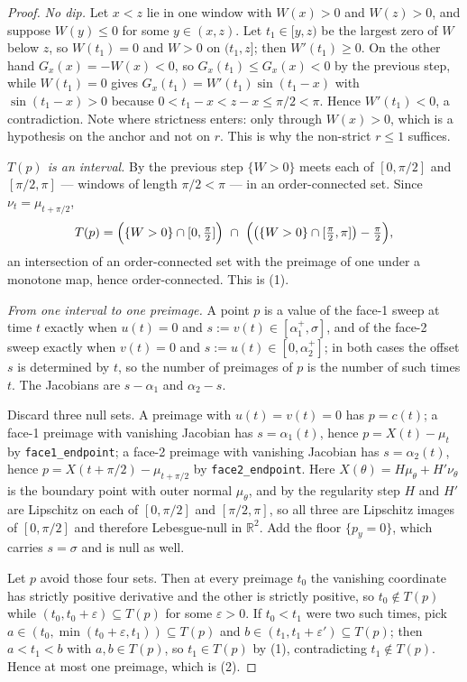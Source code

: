 \documentclass[11pt]{article}
\theoremstyle{definition}
\newcommand{\R}{\mathbb{R}}
\begin{document}
\begin{proof}
\emph{No dip.} Let $x<z$ lie in one window with $W(x)>0$ and $W(z)>0$, and suppose
$W(y)\le0$ for some $y\in(x,z)$. Let $t_1\in[y,z)$ be the largest zero of $W$ below $z$, so
$W(t_1)=0$ and $W>0$ on $(t_1,z]$; then $W'(t_1)\ge0$. On the other hand $G_x(x)=-W(x)<0$,
so $G_x(t_1)\le G_x(x)<0$ by the previous step, while $W(t_1)=0$ gives
$G_x(t_1)=W'(t_1)\sin(t_1-x)$ with $\sin(t_1-x)>0$ because $0<t_1-x<z-x\le\pi/2<\pi$. Hence
$W'(t_1)<0$, a contradiction. Note where strictness enters: only through $W(x)>0$, which is
a hypothesis on the anchor and not on $r$. This is why the non-strict $r\le1$ suffices.

\emph{$T(p)$ is an interval.} By the previous step $\{W>0\}$ meets each of $[0,\pi/2]$ and
$[\pi/2,\pi]$ --- windows of length $\pi/2<\pi$ --- in an order-connected set. Since
$\nu_t=\mu_{t+\pi/2}$,
\[
  T(p)=\Bigl(\{W>0\}\cap[0,\tfrac\pi2]\Bigr)\ \cap\
       \Bigl(\bigl(\{W>0\}\cap[\tfrac\pi2,\pi]\bigr)-\tfrac\pi2\Bigr) ,
\]
an intersection of an order-connected set with the preimage of one under a monotone map,
hence order-connected. This is (1).

\emph{From one interval to one preimage.} A point $p$ is a value of the face-1 sweep at time
$t$ exactly when $u(t)=0$ and $s:=v(t)\in[\alpha_1^+,\sigma]$, and of the face-2 sweep exactly
when $v(t)=0$ and $s:=u(t)\in[0,\alpha_2^+]$; in both cases the offset $s$ is determined by
$t$, so the number of preimages of $p$ is the number of such times $t$. The Jacobians are
$s-\alpha_1$ and $\alpha_2-s$.

Discard three null sets. A preimage with $u(t)=v(t)=0$ has $p=c(t)$; a face-1 preimage with
vanishing Jacobian has $s=\alpha_1(t)$, hence $p=X(t)-\mu_t$ by \verb|face1_endpoint|; a
face-2 preimage with vanishing Jacobian has $s=\alpha_2(t)$, hence
$p=X(t+\pi/2)-\mu_{t+\pi/2}$ by \verb|face2_endpoint|. Here $X(\theta)=H\mu_\theta+H'\nu_\theta$
is the boundary point with outer normal $\mu_\theta$, and by the regularity step $H$ and $H'$
are Lipschitz on each of $[0,\pi/2]$ and $[\pi/2,\pi]$, so all three are Lipschitz images of
$[0,\pi/2]$ and therefore Lebesgue-null in $\R^2$. Add the floor $\{p_y=0\}$, which carries
$s=\sigma$ and is null as well.

Let $p$ avoid those four sets. Then at every preimage $t_0$ the vanishing coordinate has
strictly positive derivative and the other is strictly positive, so $t_0\notin T(p)$ while
$(t_0,t_0+\varepsilon)\subseteq T(p)$ for some $\varepsilon>0$. If $t_0<t_1$ were two such
times, pick $a\in(t_0,\min(t_0+\varepsilon,t_1))\subseteq T(p)$ and $b\in(t_1,t_1+\varepsilon')
\subseteq T(p)$; then $a<t_1<b$ with $a,b\in T(p)$, so $t_1\in T(p)$ by (1), contradicting
$t_1\notin T(p)$. Hence at most one preimage, which is (2).
\end{proof}
\end{document}
